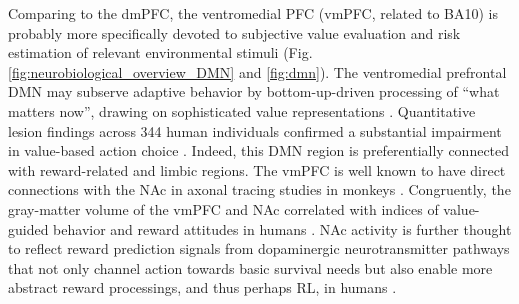 \documentclass[10pt,letterpaper]{article}
\begin{document}
Comparing to the dmPFC,
the ventromedial PFC (vmPFC, related to BA10) is probably more specifically devoted to
subjective value evaluation and
risk estimation of relevant environmental stimuli
(Fig. \ref{fig:neurobiological_overview_DMN} and \ref{fig:dmn}).
The ventromedial prefrontal DMN may
subserve adaptive behavior by bottom-up-driven
processing of “what matters now”,
drawing on sophisticated value representations
\citep{rolls_OFC, doherty2015structure}.
Quantitative lesion findings across 344 human individuals confirmed
a substantial impairment in value-based action choice
\citep{glascher2012lesion}.
Indeed,
this DMN region is preferentially connected with reward-related and limbic regions.
The vmPFC is well known to have direct connections
with the NAc
in axonal tracing studies in monkeys \citep{haber1995orbital}.
Congruently, the gray-matter volume of the vmPFC and NAc
correlated with indices of value-guided behavior and reward attitudes
in humans
\citep{lebreton2009automatic}.
NAc activity is further thought to reflect reward prediction signals
from dopaminergic neurotransmitter pathways
\citep{schultz1998predictive}
that not only channel action towards basic survival needs but also
enable more abstract reward processings, and thus perhaps RL,
in humans \citep{doherty2015structure}.
\end{document}
